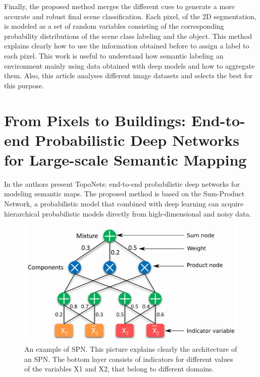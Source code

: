 \newpage

Finally, the proposed method merges the different cues to generate a more accurate and robust final scene classification. Each pixel, of the 2D segmentation, is modeled as a set of random
variables consisting of the corresponding probability distributions of the scene class labeling and the
object. This method explains clearly how to use the information obtained before to assign a label to each pixel. This work is useful to understand how semantic labeling an environment mainly using data obtained with deep models and how to aggregate them. Also, this article analyses different image datasets and selects the best for this purpose.  

\newpage

\section{From Pixels to Buildings: End-to-end Probabilistic Deep Networks for
	Large-scale Semantic Mapping \cite{8967568}}

In \cite{8967568} the authors present TopoNets: end-to-end probabilistic deep networks for modeling semantic maps. The proposed method is based on the Sum-Product Network, a probabilistic model that combined with deep learning can acquire hierarchical probabilistic models directly from high-dimensional and noisy data.

\begin{figure}[h!]
	\centering
	\includegraphics[width=0.7\linewidth]{images/SPN.jpg}
	\caption{An example of SPN. This picture explains clearly the architecture of an SPN. The bottom layer consists of indicators for different values of the variables X1 and X2, that belong to different domains.}
\end{figure}

